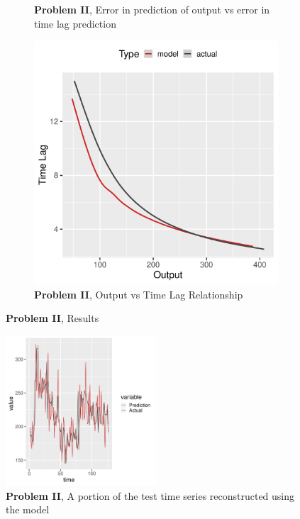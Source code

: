 \documentclass[envcountsect,runningheads]{llncs}
\theoremstyle{etoile}
\begin{document}
\begin{figure}
\begin{subfigure}[b]{0.4\textwidth}
    \caption{ \textbf{Problem II}, Error in prediction of output vs error in time lag prediction} 
    \label{fig:problem2_error}
  \end{subfigure}
  \quad
  \begin{subfigure}[b]{0.4\textwidth}
    \centering
    \includegraphics[width=\textwidth]{figures/exp2_predictive_curves}
    \caption{ \textbf{Problem II}, Output vs Time Lag Relationship} 
    \label{fig:problem2_curves}
  \end{subfigure}
  
  \caption{\textbf{Problem II}, Results}
\end{figure}



\begin{figure}[h]
\vspace{.3in}
\centerline{\includegraphics[width=0.5\textwidth]{figures/exp2_timeseries_pred}}
\vspace{.3in}
\caption{\textbf{Problem II}, A portion of the test time series reconstructed using the model}
\label{fig:problem2_timeseries}
\end{figure}
\end{document}
